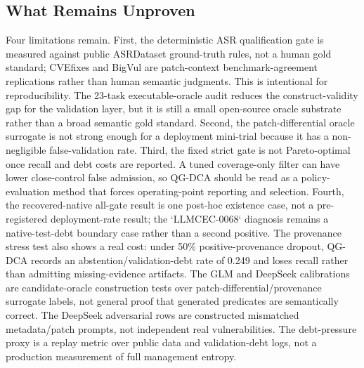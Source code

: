 ﻿\documentclass[lettersize,journal]{IEEEtran}
\begin{document}
\subsection{What Remains Unproven}
Four limitations remain. First, the deterministic ASR qualification gate is measured against public ASRDataset ground-truth rules, not a human gold standard; CVEfixes and BigVul are patch-context benchmark-agreement replications rather than human semantic judgments. This is intentional for reproducibility. The 23-task executable-oracle audit reduces the construct-validity gap for the validation layer, but it is still a small open-source oracle substrate rather than a broad semantic gold standard. Second, the patch-differential oracle surrogate is not strong enough for a deployment mini-trial because it has a non-negligible false-validation rate. Third, the fixed strict gate is not Pareto-optimal once recall and debt costs are reported. A tuned coverage-only filter can have lower close-control false admission, so QG-DCA should be read as a policy-evaluation method that forces operating-point reporting and selection. Fourth, the recovered-native all-gate result is one post-hoc existence case, not a pre-registered deployment-rate result; the `LLMCEC-0068` diagnosis remains a native-test-debt boundary case rather than a second positive. The provenance stress test also shows a real cost: under 50\% positive-provenance dropout, QG-DCA records an abstention/validation-debt rate of 0.249 and loses recall rather than admitting missing-evidence artifacts. The GLM and DeepSeek calibrations are candidate-oracle construction tests over patch-differential/provenance surrogate labels, not general proof that generated predicates are semantically correct. The DeepSeek adversarial rows are constructed mismatched metadata/patch prompts, not independent real vulnerabilities. The debt-pressure proxy is a replay metric over public data and validation-debt logs, not a production measurement of full management entropy.
\end{document}
